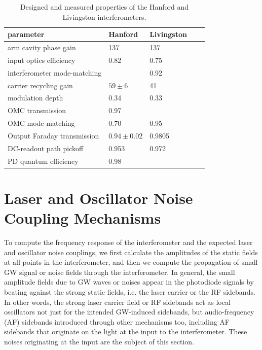 \begin{table}
\centering
\begin{tabular}{l l l l l}
\hline 
\textbf{parameter}          &\textbf{Hanford}&\textbf{Livingston}  \\
\hline
arm cavity phase gain       & 137            & 137         \\
input optics efficiency     & 0.82           & 0.75        \\
interferometer mode-matching&                & 0.92        \\
carrier recycling gain      & $59\pm6$       & 41          \\
modulation depth            & 0.34           & 0.33        \\
OMC transmission            & 0.97           &             \\
OMC mode-matching           & 0.70           & 0.95        \\
Output Faraday transmission & $0.94\pm0.02$  & 0.9805      \\
DC-readout path pickoff     & 0.953          & 0.972       \\
PD quantum efficiency       & 0.98           &             \\
\hline
\end{tabular}
\caption[Interferometer properties (designed and measured)]{Designed and measured properties of the Hanford and Livingston interferometers.}
\label{tab:ifo-properties}
\end{table}


\section{Laser and Oscillator Noise Coupling Mechanisms}


To compute the frequency response of the interferometer and the
expected laser and oscillator noise couplings, we first calculate the
amplitudes of the static fields at all points in the interferometer,
and then we compute the propagation of small GW signal or noise fields
through the interferometer.  In general, the small amplitude fields
due to GW waves or noises appear in the photodiode signals by beating
against the strong static fields, i.e. the laser carrier or the RF
sidebands.  In other words, the strong laser carrier field or RF
sidebands act as local oscillators not just for the intended
GW-induced sidebands, but audio-frequency (AF) sidebands introduced
through other mechanisms too, including AF sidebands that originate on
the light at the input to the interferometer.  These noises originating
at the input are the subject of this section.

